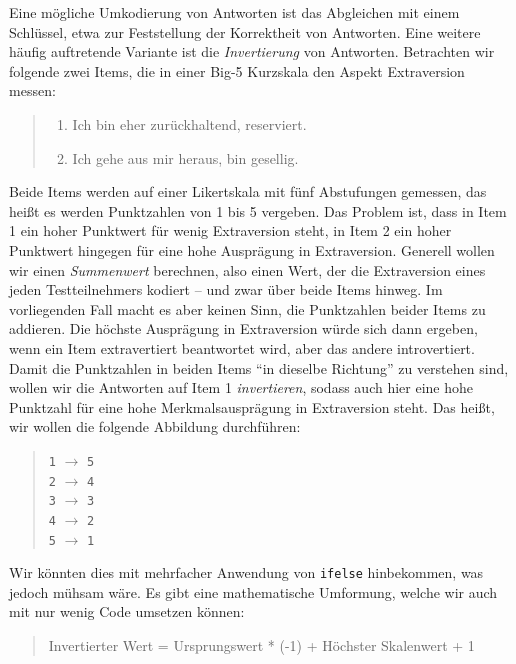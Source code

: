 \documentclass[12pt,]{tufte-book}
\providecommand{\tightlist}{%
  \setlength{\itemsep}{0pt}\setlength{\parskip}{0pt}}
\theoremstyle{definition}
\theoremstyle{definition}
\theoremstyle{definition}
\theoremstyle{remark}
\begin{document}
Eine mögliche Umkodierung von Antworten ist das Abgleichen mit einem
Schlüssel, etwa zur Feststellung der Korrektheit von Antworten. Eine
weitere häufig auftretende Variante ist die \emph{Invertierung} von
Antworten. Betrachten wir folgende zwei Items, die in einer Big-5
Kurzskala den Aspekt Extraversion messen:

\begin{quote}
\begin{enumerate}
\def\labelenumi{\arabic{enumi}.}
\tightlist
\item
  Ich bin eher zurückhaltend, reserviert.
\item
  Ich gehe aus mir heraus, bin gesellig.
\end{enumerate}
\end{quote}

Beide Items werden auf einer Likertskala mit fünf Abstufungen gemessen,
das heißt es werden Punktzahlen von 1 bis 5 vergeben. Das Problem ist,
dass in Item 1 ein hoher Punktwert für wenig Extraversion steht, in Item
2 ein hoher Punktwert hingegen für eine hohe Ausprägung in Extraversion.
Generell wollen wir einen \emph{Summenwert} berechnen, also einen Wert,
der die Extraversion eines jeden Testteilnehmers kodiert -- und zwar
über beide Items hinweg. Im vorliegenden Fall macht es aber keinen Sinn,
die Punktzahlen beider Items zu addieren. Die höchste Ausprägung in
Extraversion würde sich dann ergeben, wenn ein Item extravertiert
beantwortet wird, aber das andere introvertiert. Damit die Punktzahlen
in beiden Items ``in dieselbe Richtung'' zu verstehen sind, wollen wir
die Antworten auf Item 1 \emph{invertieren}, sodass auch hier eine hohe
Punktzahl für eine hohe Merkmalsausprägung in Extraversion steht. Das
heißt, wir wollen die folgende Abbildung durchführen:

\begin{quote}
\texttt{1} \(\to\) \texttt{5}\\
\texttt{2} \(\to\) \texttt{4}\\
\texttt{3} \(\to\) \texttt{3}\\
\texttt{4} \(\to\) \texttt{2}\\
\texttt{5} \(\to\) \texttt{1}
\end{quote}

Wir könnten dies mit mehrfacher Anwendung von \texttt{ifelse}
hinbekommen, was jedoch mühsam wäre. Es gibt eine mathematische
Umformung, welche wir auch mit nur wenig Code umsetzen können:

\begin{quote}
Invertierter Wert = Ursprungswert * (-1) + Höchster Skalenwert + 1
\end{quote}
\end{document}

